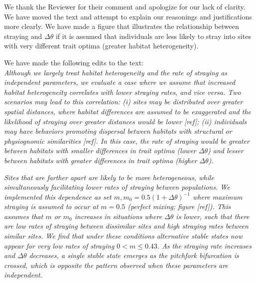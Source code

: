 \documentclass[ucm,12pt]{ucletter}
\begin{document}
\begin{letter}
 We thank the Reviewer for their comment and apologize for our lack of clarity. We have moved the text and attempt to explain our reasonings and justifications more clearly. We have made a figure that illustrates the relationship between straying and $\Delta\theta$ if it is assumed that individuals are less likely to stray into sites with very different trait optima (greater habitat heterogeneity).

\noindent We have made the following edits to the text:\\
 \emph{Although we largely treat habitat heterogeneity and the rate of straying as independent parameters, we evaluate a case where we assume that increased habitat heterogeneity correlates with lower straying rates, and vice versa.
Two scenarios may lead to this correlation: 
(\emph{i}) sites may be distributed over greater spatial distances, where habitat differences are assumed to be exaggerated and the likelihood of straying over greater distances would be lower [ref];
(\emph{ii}) individuals may have behaviors promoting dispersal between habitats with structural or physiognomic similarities [ref].
In this case, the rate of straying would be greater between habitats with smaller differences in trait optima (lower $\Delta\theta$) and lesser between habitats with greater differences in trait optima (higher $\Delta\theta$).}

 \emph{Sites that are farther apart are likely to be more heterogeneous, while simultaneously facilitating lower rates of straying between populations.
We implemented this dependence as set $m,m_0 = 0.5(1 + \Delta\theta)^{-1}$ where maximum straying is assumed to occur at $m=0.5$ (perfect mixing; figure [ref]).
This assumes that $m$ or $m_0$ increases in situations where $\Delta\theta$ is lower, such that there are low rates of straying between dissimilar sites and high straying rates between similar sites.
We find that under these conditions alternative stable states now appear for very low rates of straying $0 < m \leq 0.43$.
As the straying rate increases and $\Delta\theta$ decreases, a single stable state emerges as the pitchfork bifurcation is crossed, which is opposite the pattern observed when these parameters are independent.}


\end{letter}
\end{document}
